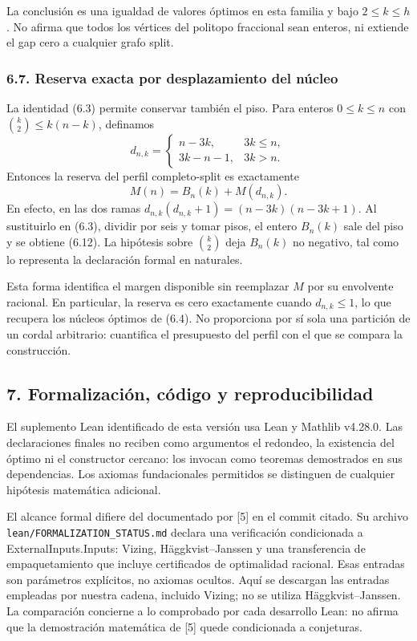 \documentclass[spanish,11pt,a4paper]{article}
\begin{document}
La conclusión es una igualdad de valores óptimos en esta familia y bajo \(2\le k\le h\). No afirma que todos los vértices del politopo fraccional sean enteros, ni extiende el gap cero a cualquier grafo split.

\subsubsection{6.7. Reserva exacta por desplazamiento del núcleo}\label{reserva-exacta-por-desplazamiento-del-nucleo}

La identidad (6.3) permite conservar también el piso. Para enteros \(0\le k\le n\) con \(\binom k2\le k(n-k)\), definamos \[
d_{n,k}=\begin{cases}n-3k,&3k\le n,\\3k-n-1,&3k>n.\end{cases}
\] Entonces la reserva del perfil completo-split es exactamente \[
M(n)=B_n(k)+M(d_{n,k}).
\tag{6.12}
\] En efecto, en las dos ramas \(d_{n,k}(d_{n,k}+1)=(n-3k)(n-3k+1)\). Al sustituirlo en (6.3), dividir por seis y tomar pisos, el entero \(B_n(k)\) sale del piso y se obtiene (6.12). La hipótesis sobre \(\binom k2\) deja \(B_n(k)\) no negativo, tal como lo representa la declaración formal en naturales.

Esta forma identifica el margen disponible sin reemplazar \(M\) por su envolvente racional. En particular, la reserva es cero exactamente cuando \(d_{n,k}\le1\), lo que recupera los núcleos óptimos de (6.4). No proporciona por sí sola una partición de un cordal arbitrario: cuantifica el presupuesto del perfil con el que se compara la construcción.

\subsection{7. Formalización, código y reproducibilidad}\label{formalizacion-codigo-y-reproducibilidad}

El suplemento Lean identificado de esta versión usa Lean y Mathlib v4.28.0. Las declaraciones finales no reciben como argumentos el redondeo, la existencia del óptimo ni el constructor cercano: los invocan como teoremas demostrados en sus dependencias. Los axiomas fundacionales permitidos se distinguen de cualquier hipótesis matemática adicional.

El alcance formal difiere del documentado por {[}5{]} en el commit citado. Su archivo \nolinkurl{lean/FORMALIZATION_STATUS.md} declara una verificación condicionada a {\ttfamily\small ExternalInpu\discretionary{\hbox{\ensuremath{\hookrightarrow}}}{}{}ts.\discretionary{\hbox{\ensuremath{\hookrightarrow}}}{}{}Inputs}: Vizing, Häggkvist--Janssen y una transferencia de empaquetamiento que incluye certificados de optimalidad racional. Esas entradas son parámetros explícitos, no axiomas ocultos. Aquí se descargan las entradas empleadas por nuestra cadena, incluido Vizing; no se utiliza Häggkvist--Janssen. La comparación concierne a lo comprobado por cada desarrollo Lean: no afirma que la demostración matemática de {[}5{]} quede condicionada a conjeturas.
\end{document}
